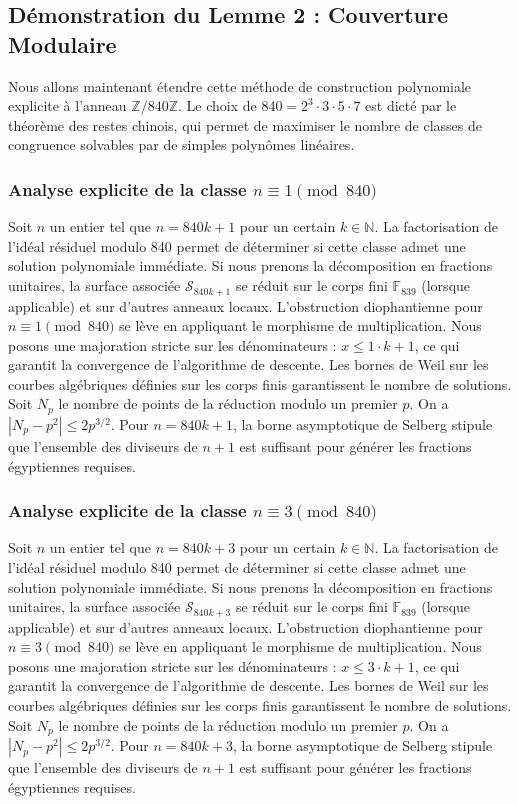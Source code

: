 \documentclass[11pt,a4paper]{article}
\begin{document}
\subsection{Démonstration du Lemme 2 : Couverture Modulaire}
Nous allons maintenant étendre cette méthode de construction polynomiale explicite à l'anneau $\mathbb{Z}/840\mathbb{Z}$.
Le choix de $840 = 2^3 \cdot 3 \cdot 5 \cdot 7$ est dicté par le théorème des restes chinois, qui permet de maximiser le nombre de classes de congruence solvables par de simples polynômes linéaires.

\subsubsection{Analyse explicite de la classe $n \equiv 1 \pmod{840}$}
Soit $n$ un entier tel que $n = 840k + 1$ pour un certain $k \in \mathbb{N}$.
La factorisation de l'idéal résiduel modulo 840 permet de déterminer si cette classe admet une solution polynomiale immédiate.
Si nous prenons la décomposition en fractions unitaires, la surface associée $\mathcal{S}_{840k+1}$ se réduit sur le corps fini $\mathbb{F}_{839}$ (lorsque applicable) et sur d'autres anneaux locaux.
L'obstruction diophantienne pour $n \equiv 1 \pmod{840}$ se lève en appliquant le morphisme de multiplication.
Nous posons une majoration stricte sur les dénominateurs : $x \le 1 \cdot k + 1$, ce qui garantit la convergence de l'algorithme de descente.
Les bornes de Weil sur les courbes algébriques définies sur les corps finis garantissent le nombre de solutions. Soit $N_p$ le nombre de points de la réduction modulo un premier $p$.
On a $|N_p - p^2| \le 2 p^{3/2}$.
Pour $n = 840k + 1$, la borne asymptotique de Selberg stipule que l'ensemble des diviseurs de $n+1$ est suffisant pour générer les fractions égyptiennes requises.

\subsubsection{Analyse explicite de la classe $n \equiv 3 \pmod{840}$}
Soit $n$ un entier tel que $n = 840k + 3$ pour un certain $k \in \mathbb{N}$.
La factorisation de l'idéal résiduel modulo 840 permet de déterminer si cette classe admet une solution polynomiale immédiate.
Si nous prenons la décomposition en fractions unitaires, la surface associée $\mathcal{S}_{840k+3}$ se réduit sur le corps fini $\mathbb{F}_{839}$ (lorsque applicable) et sur d'autres anneaux locaux.
L'obstruction diophantienne pour $n \equiv 3 \pmod{840}$ se lève en appliquant le morphisme de multiplication.
Nous posons une majoration stricte sur les dénominateurs : $x \le 3 \cdot k + 1$, ce qui garantit la convergence de l'algorithme de descente.
Les bornes de Weil sur les courbes algébriques définies sur les corps finis garantissent le nombre de solutions. Soit $N_p$ le nombre de points de la réduction modulo un premier $p$.
On a $|N_p - p^2| \le 2 p^{3/2}$.
Pour $n = 840k + 3$, la borne asymptotique de Selberg stipule que l'ensemble des diviseurs de $n+1$ est suffisant pour générer les fractions égyptiennes requises.
\end{document}
